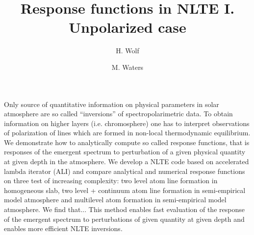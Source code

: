 \documentclass[referee]{aa}
\begin{document}
   \title{Response functions in NLTE I. Unpolarized case}

   \subtitle{}

   \author{H. Wolf
   \and
   M. Waters}
   

   \date{}


  \abstract
   {Only source of quantitative information on physical parameters in solar atmosphere are so called ``inversions'' of spectropolarimetric data. To obtain information on higher layers (i.e. chromosphere) one has to interpret observations of polarization of lines which are formed in non-local thermodynamic equilibrium.}
  {We demonstrate how to analytically compute so called response functions, that is responses of the emergent spectrum to perturbation of a given physical quantity at given depth in the atmosphere.}
   {We develop a NLTE code based on accelerated lambda iterator (ALI) and compare analytical and numerical response functions on three test of increasing complexity: two level atom line formation in homogeneous slab, two level + continuum atom line formation in semi-empirical model atmosphere and multilevel atom formation in semi-empirical model atmosphere. }
   {We find that... } 
   {This method enables fast evaluation of the response of the emergent spectrum to perturbations of given quantity at given depth and enables more efficient NLTE inversions.}


   \maketitle

\end{document}
